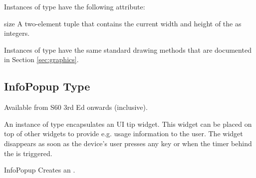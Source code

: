 Instances of  type have the following attribute:

\begin{memberdesc}[Canvas]{size}
A two-element tuple that contains the current width and height of the 
 as integers.
\end{memberdesc}

Instances of  type have the same standard drawing methods 
that are documented in Section \ref{sec:graphics}.

\subsection{InfoPopup Type}
\label{subsec:infopopup}

\begin{notice}[note]
Available from S60 3rd Ed onwards (inclusive).
\end{notice}

An instance of  type encapsulates an UI tip widget. This widget 
can be placed on top of other widgets to provide e.g. usage information to the 
user. The widget disappears as soon as the device's user presses any key or when 
the timer behind the  is triggered.

\begin{classdesc}{InfoPopup}{}
Creates an .
\end{classdesc}

